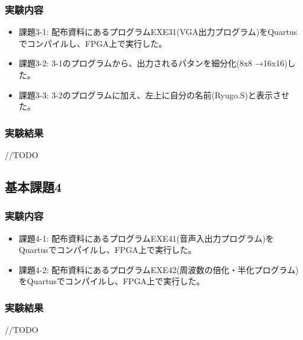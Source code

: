 \subsubsection{実験内容}
\begin{itemize}
    \item 課題3-1: 配布資料にあるプログラムEXE31(VGA出力プログラム)をQuartusでコンパイルし、FPGA上で実行した。
    \item 課題3-2: 3-1のプログラムから、出力されるパタンを細分化(8x8 →16x16)した。
    \item 課題3-3: 3-2のプログラムに加え、左上に自分の名前(Ryugo.S)と表示させた。
\end{itemize}
\subsubsection{実験結果}
//TODO

\subsection{基本課題4}
\subsubsection{実験内容}
\begin{itemize}
    \item 課題4-1: 配布資料にあるプログラムEXE41(音声入出力プログラム)をQuartusでコンパイルし、FPGA上で実行した。
    \item 課題4-2: 配布資料にあるプログラムEXE42(周波数の倍化・半化プログラム)をQuartusでコンパイルし、FPGA上で実行した。
\end{itemize}
\subsubsection{実験結果}
//TODO